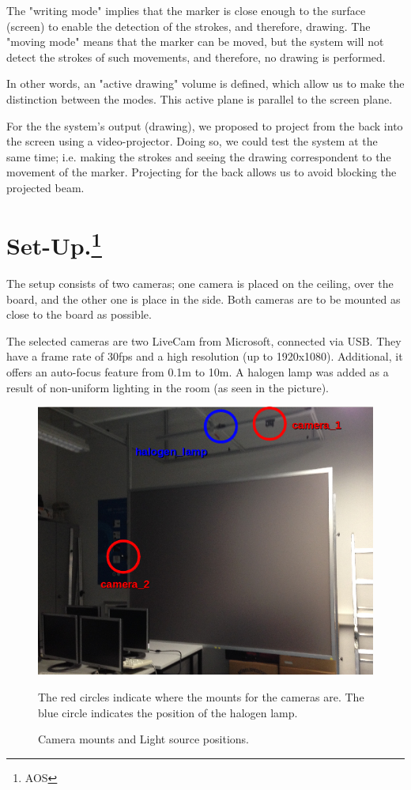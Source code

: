 \documentclass[a4paper,12pt]{article}
\begin{document}
The "writing mode" implies that the marker is close enough to the surface (screen) to enable the detection of the strokes, and therefore, drawing. The "moving mode" means that the marker can be moved, but the system will not detect the strokes of such movements, and therefore, no drawing is performed.

In other words, an "active drawing" volume is defined, which allow us to make the distinction between the modes. This active plane is parallel to the screen plane.

For the the system's output (drawing), we proposed to project from the back into the screen using a video-projector. Doing so, we could test the system at the same time; i.e. making the strokes and seeing the drawing correspondent to the movement of the marker. Projecting for the back allows us to avoid blocking the projected beam.

\section[Set-Up.]{Set-Up.\footnote{AOS}}
The setup consists of two cameras; one camera is placed on the ceiling, over the board, and the other one is place in the side. Both cameras are to be mounted as close to the board as possible.

The selected cameras are two LiveCam from Microsoft, connected via USB. They have a frame rate of 30fps and a high resolution (up to 1920x1080). Additional, it offers an auto-focus feature from 0.1m to 10m. A halogen lamp was added as a result of non-uniform lighting in the room (as seen in the picture).

\begin{figure}[H]
    \begin{center}
	\includegraphics[width=12cm]{setupCams}
	\caption{Camera mounts and Light source positions.}
    The red circles indicate where the mounts for the cameras are. The blue circle indicates the position of the halogen lamp.
	\label{fig:setupcams}
    \end{center}
\end{figure}
\end{document}
